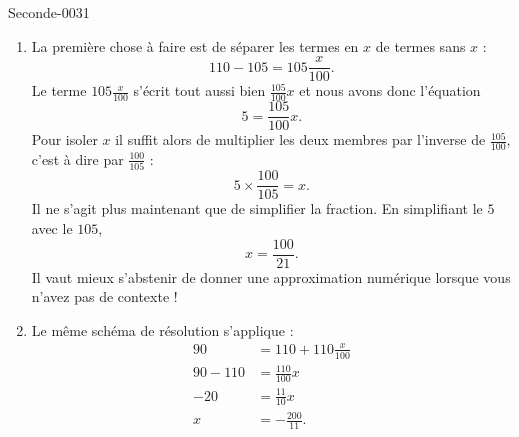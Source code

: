 
\begin{corrige}{Seconde-0031}

    \begin{enumerate}
        \item
            La première chose à faire est de séparer les termes en \( x\) de termes sans \( x\) :
            \begin{equation}
                110-105=105\frac{ x }{ 100 }.
            \end{equation}
            Le terme \( 105\frac{ x }{ 100 }\) s'écrit tout aussi bien \( \frac{ 105 }{ 100 }x\) et nous avons donc l'équation
            \begin{equation}
                5=\frac{ 105 }{ 100 }x.
            \end{equation}
            Pour isoler \( x\) il suffit alors de multiplier les deux membres par l'inverse de \( \frac{ 105 }{ 100 }\), c'est à dire par \( \frac{ 100 }{ 105 }\) :
            \begin{equation}
                5\times \frac{ 100 }{ 105 }=x.
            \end{equation}
            Il ne s'agit plus maintenant que de simplifier la fraction. En simplifiant le \( 5\) avec le \( 105\),
            \begin{equation}
                x=\frac{ 100 }{ 21 }.
            \end{equation}
            Il vaut mieux s'abstenir de donner une approximation numérique lorsque vous n'avez pas de contexte !

        \item
            Le même schéma de résolution s'applique :
            \begin{subequations}
                \begin{align}
                    90&=110+110\frac{ x }{ 100 }\\
                    90-110&=\frac{ 110 }{ 100 }x\\
                    -20&=\frac{ 11 }{ 10 }x\\
                    x&=-\frac{ 200 }{ 11 }.
                \end{align}
            \end{subequations}
    \end{enumerate}

\end{corrige}
